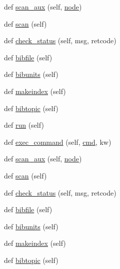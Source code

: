\begin{DoxyCompactItemize}
\item 
def \hyperlink{classwaflib_1_1_tools_1_1tex_1_1tex_abd3866cf63c379f3bdd3e1568f32182a}{scan\+\_\+aux} (self, \hyperlink{structnode}{node})
\item 
def \hyperlink{classwaflib_1_1_tools_1_1tex_1_1tex_a9a1611c5caf6c5ef3bf0efbcd7cdb0b4}{scan} (self)
\item 
def \hyperlink{classwaflib_1_1_tools_1_1tex_1_1tex_ac5e3e5ed9bae28652ceec355e87c041b}{check\+\_\+status} (self, msg, retcode)
\item 
def \hyperlink{classwaflib_1_1_tools_1_1tex_1_1tex_a84f06095e6adb078c76849aaad9caaa7}{bibfile} (self)
\item 
def \hyperlink{classwaflib_1_1_tools_1_1tex_1_1tex_adc9975ca42cc99bdfed2453d0501deb7}{bibunits} (self)
\item 
def \hyperlink{classwaflib_1_1_tools_1_1tex_1_1tex_a037e014ad6faffb9d86bce5a13038776}{makeindex} (self)
\item 
def \hyperlink{classwaflib_1_1_tools_1_1tex_1_1tex_a91f60e48f7933bde8c62a1108c408f84}{bibtopic} (self)
\item 
def \hyperlink{classwaflib_1_1_tools_1_1tex_1_1tex_a9ca231d8975e3c1d5d3c9e455f31f892}{run} (self)
\item 
def \hyperlink{classwaflib_1_1_tools_1_1tex_1_1tex_af3bd4c7abea22374fe7cb435022880cd}{exec\+\_\+command} (self, \hyperlink{sndfile__play_8m_adfc5ba7e22f5e4a6221c12a70503bef3}{cmd}, kw)
\item 
def \hyperlink{classwaflib_1_1_tools_1_1tex_1_1tex_abd3866cf63c379f3bdd3e1568f32182a}{scan\+\_\+aux} (self, \hyperlink{structnode}{node})
\item 
def \hyperlink{classwaflib_1_1_tools_1_1tex_1_1tex_a9a1611c5caf6c5ef3bf0efbcd7cdb0b4}{scan} (self)
\item 
def \hyperlink{classwaflib_1_1_tools_1_1tex_1_1tex_ac5e3e5ed9bae28652ceec355e87c041b}{check\+\_\+status} (self, msg, retcode)
\item 
def \hyperlink{classwaflib_1_1_tools_1_1tex_1_1tex_a84f06095e6adb078c76849aaad9caaa7}{bibfile} (self)
\item 
def \hyperlink{classwaflib_1_1_tools_1_1tex_1_1tex_adc9975ca42cc99bdfed2453d0501deb7}{bibunits} (self)
\item 
def \hyperlink{classwaflib_1_1_tools_1_1tex_1_1tex_a037e014ad6faffb9d86bce5a13038776}{makeindex} (self)
\item 
def \hyperlink{classwaflib_1_1_tools_1_1tex_1_1tex_a91f60e48f7933bde8c62a1108c408f84}{bibtopic} (self)
\item 

\end{DoxyCompactItemize}
